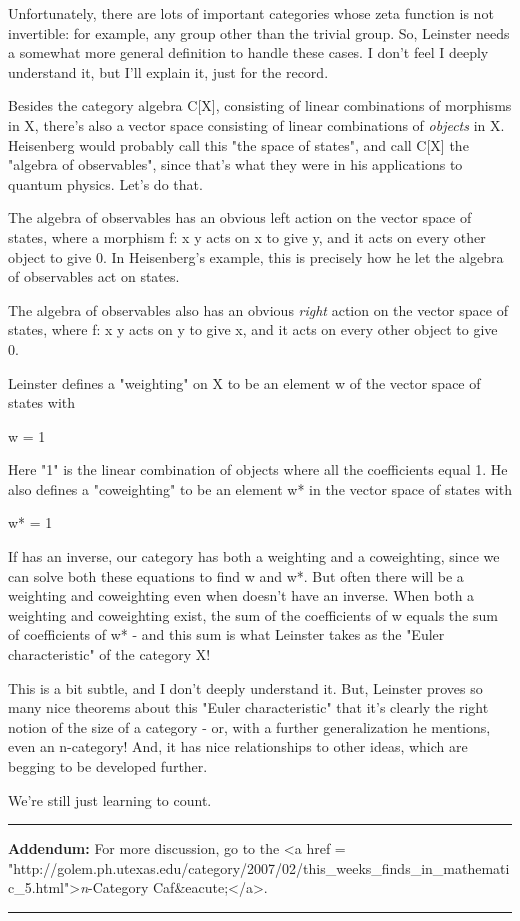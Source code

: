 Unfortunately, there are lots of important categories whose zeta
function is not invertible: for example, any group other than the
trivial group.  So, Leinster needs a somewhat more general definition
to handle these cases.  I don't feel I deeply understand it, but I'll
explain it, just for the record.

Besides the category algebra C[X], consisting of linear combinations
of morphisms in X, there's also a vector space consisting of linear
combinations of \emph{objects} in X.  Heisenberg would probably call
this "the space of states", and call C[X] the "algebra
of observables", since that's what they were in his applications
to quantum physics.  Let's do that.

The algebra of observables has an obvious left action on the vector 
space of states, where a morphism f: x \to  y acts on x to give y, and 
it acts on every other object to give 0.  In Heisenberg's example, 
this is precisely how he let the algebra of observables act on states.

The algebra of observables also has an obvious \emph{right} action
on the vector space of states, where f: x \to  y acts on y to give
x, and it acts on every other object to give 0.

Leinster defines a "weighting" on X to be an element w of
the vector space of states with

\zeta  w = 1

Here "1" is the linear combination of objects where all the
coefficients equal 1.  He also defines a "coweighting" to be
an element w* in the vector space of states with

w* \zeta  = 1

If \zeta  has an inverse, our category has both a weighting and a
coweighting, since we can solve both these equations to find w and w*.
But often there will be a weighting and coweighting even when \zeta 
doesn't have an inverse.  When both a weighting and coweighting exist,
the sum of the coefficients of w equals the sum of coefficients of w*
- and this sum is what Leinster takes as the "Euler
characteristic" of the category X!

This is a bit subtle, and I don't deeply understand it.  But, Leinster
proves so many nice theorems about this "Euler characteristic" that 
it's clearly the right notion of the size of a category - or, with a
further generalization he mentions, even an n-category!  And, it has 
nice relationships to other ideas, which are begging to be developed
further.

We're still just learning to count.

\par\noindent\rule{\textwidth}{0.4pt}
\textbf{Addendum:} For more discussion, go to the <a href = "http://golem.ph.utexas.edu/category/2007/02/this_weeks_finds_in_mathematic_5.html">\emph{n}-Category
Caf&eacute;</a>.





\par\noindent\rule{\textwidth}{0.4pt}
